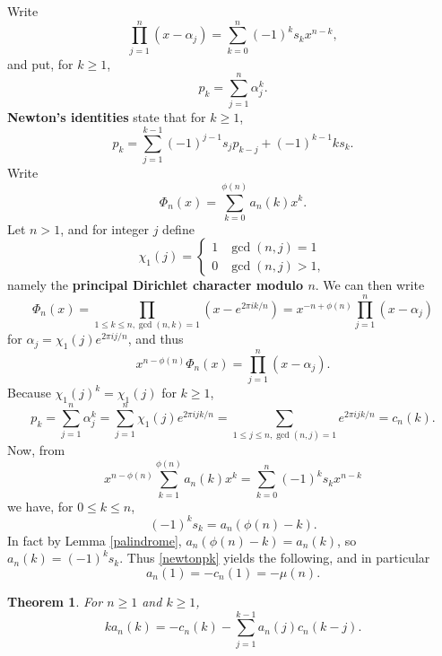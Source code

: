 \documentclass{amsart}
\newtheorem{theorem}{Theorem}
\theoremstyle{definition}
\begin{document}
Write
\[
\prod_{j=1}^n (x-\alpha_j) = \sum_{k=0}^n (-1)^k s_k x^{n-k},
\]
and put, for $k \geq 1$,
\[
p_k = \sum_{j=1}^n \alpha_j^k.
\]
\textbf{Newton's identities} \cite[p.~32, Proposition 3.4]{escofier} state that for $k \geq 1$,
\begin{equation}
p_k = \sum_{j=1}^{k-1} (-1)^{j-1} s_j p_{k-j} + (-1)^{k-1} k s_k.
\label{newtonpk}
\end{equation}
Write
\[
\Phi_n(x) = \sum_{k=0}^{\phi(n)} a_n(k) x^k.
\]
Let $n > 1$, and for  integer $j$ define
\[
\chi_1(j) = \begin{cases}
1&\gcd(n,j)=1\\
0&\gcd(n,j)>1,
\end{cases}
\]
namely the \textbf{principal Dirichlet character modulo $n$}. 
We can then write 
\[
\Phi_n(x) = \prod_{1 \leq k \leq n, \gcd(n,k)=1} (x-e^{2\pi ik/n})
=x^{-n+\phi(n)}  \prod_{j=1}^n (x-\alpha_j)
\]
for
 $\alpha_j = \chi_1(j) e^{2\pi ij/n}$, and thus
 \[
x^{n-\phi(n)} \Phi_n(x) = \prod_{j=1}^n (x-\alpha_j).
 \]
Because $\chi_1(j)^k=\chi_1(j)$ for $k \geq 1$,
\[
p_k = \sum_{j=1}^n \alpha_j^k = \sum_{j=1}^n \chi_1(j) e^{2\pi ijk/n}
=\sum_{1 \leq j \leq n, \gcd(n,j)=1} e^{2\pi ijk/n} = c_n(k).
\]
Now, from
\[
x^{n-\phi(n)} \sum_{k=1}^{\phi(n)}  a_n(k) x^k =  \sum_{k=0}^n (-1)^k s_k x^{n-k}
\]
we have, for $0 \leq k \leq n$,
\[
(-1)^k s_k = a_n(\phi(n)-k).
\]
In fact by Lemma \ref{palindrome}, $a_n(\phi(n)-k)=a_n(k)$, so $a_n(k) = (-1)^k s_k$. 
Thus \eqref{newtonpk} yields the following,
and in particular 
\[
a_n(1) = -c_n(1) = -\mu(n).
\]

\begin{theorem}
For $n \geq 1$ and $k \geq 1$,
\[
ka_n(k) = -c_n(k) - \sum_{j=1}^{k-1} a_n(j) c_n(k-j).
\]
\end{theorem}
\end{document}
